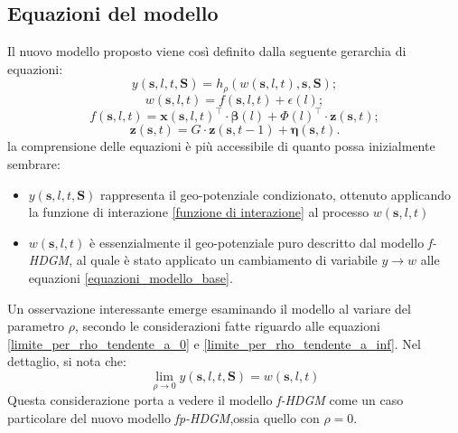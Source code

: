 \subsection[Equazioni del modello]{Equazioni del modello}
Il nuovo modello proposto viene così definito dalla seguente gerarchia di equazioni:
\begin{equation}
	y(\mathbf{s}, l, t,\mathbf{S}) = h_\rho(w(\mathbf{s}, l, t), \mathbf{s}, \mathbf{S});
	\label{eq_rumore_uscita}
\end{equation}
\begin{equation}
	w(\mathbf{s}, l, t)= f(\mathbf{s}, l, t) + \epsilon(l);
	\label{eq_rumore_uscita}
\end{equation}
\begin{equation}
	f(\mathbf{s}, l, t) = \mathbf{x}(\mathbf{s}, l, t)^\top\cdot\boldsymbol{\beta}(l) + \Phi(l)^\top\cdot\mathbf{z}(\mathbf{s}, t);
	\label{eq_comp_det}
\end{equation}
\begin{equation}
	\mathbf{z}(\mathbf{s}, t) = G\cdot \mathbf{z}(\mathbf{s}, t-1) + \boldsymbol{\eta}(\mathbf{s}, t).
	\label{eq_comp_lat}
\end{equation}
la comprensione delle equazioni è più accessibile di quanto possa inizialmente sembrare:
\begin{itemize}
	\item $y(\mathbf{s}, l, t,\mathbf{S})$ rappresenta il geo-potenziale condizionato, ottenuto applicando la funzione di interazione \ref{funzione di interazione} al processo $w(\mathbf{s}, l, t)$ 
	\item $w(\mathbf{s}, l, t)$ è essenzialmente il geo-potenziale puro descritto dal modello \textit{f-HDGM}, al quale è stato applicato un cambiamento di variabile $y \longrightarrow w$ alle equazioni \ref{equazioni_modello_base}.
\end{itemize}
Un osservazione interessante emerge esaminando il modello al variare del parametro $\rho$, secondo le considerazioni fatte riguardo alle equazioni \ref{limite_per_rho_tendente_a_0} e \ref{limite_per_rho_tendente_a_inf}. Nel dettaglio, si nota che:
\begin{equation}
	\lim_{\rho \to 0} y(\mathbf{s}, l, t,\mathbf{S}) = w(\mathbf{s}, l, t) \label{limite_geo-potenziale_condizionato_rho_a_0}
\end{equation}
Questa considerazione porta a vedere il modello \textit{f-HDGM} come un caso particolare del nuovo modello \textit{fp-HDGM},ossia quello con $\rho=0$.
